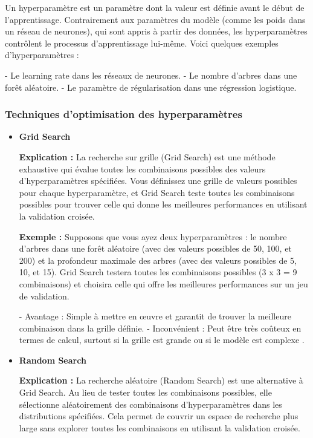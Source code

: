 \documentclass[10pt,a4paper]{article}
\begin{document}
Un hyperparamètre est un paramètre dont la valeur est définie avant le début de l'apprentissage. Contrairement aux paramètres du modèle (comme les poids dans un réseau de neurones), qui sont appris à partir des données, les hyperparamètres contrôlent le processus d'apprentissage lui-même. Voici quelques exemples d'hyperparamètres :

- Le learning rate dans les réseaux de neurones.
- Le nombre d'arbres dans une forêt aléatoire.
- Le paramètre de régularisation dans une régression logistique.

\subsubsection*{Techniques d'optimisation des hyperparamètres}

\begin{itemize}
    \item \textbf{Grid Search}

    \textbf{Explication :}
    La recherche sur grille (Grid Search) est une méthode exhaustive qui évalue toutes les combinaisons possibles des valeurs d'hyperparamètres spécifiées. Vous définissez une grille de valeurs possibles pour chaque hyperparamètre, et Grid Search teste toutes les combinaisons possibles pour trouver celle qui donne les meilleures performances en utilisant la validation croisée.

    \textbf{Exemple :}
    Supposons que vous ayez deux hyperparamètres : le nombre d'arbres dans une forêt aléatoire (avec des valeurs possibles de 50, 100, et 200) et la profondeur maximale des arbres (avec des valeurs possibles de 5, 10, et 15). Grid Search testera toutes les combinaisons possibles (3 x 3 = 9 combinaisons) et choisira celle qui offre les meilleures performances sur un jeu de validation.

    - Avantage : Simple à mettre en œuvre et garantit de trouver la meilleure combinaison dans la grille définie.
    - Inconvénient : Peut être très coûteux en termes de calcul, surtout si la grille est grande ou si le modèle est complexe \cite{hyperparameter_tuning}.

    \item \textbf{Random Search}

    \textbf{Explication :}
    La recherche aléatoire (Random Search) est une alternative à Grid Search. Au lieu de tester toutes les combinaisons possibles, elle sélectionne aléatoirement des combinaisons d'hyperparamètres dans les distributions spécifiées. Cela permet de couvrir un espace de recherche plus large sans explorer toutes les combinaisons en utilisant la validation croisée.


\end{itemize}
\end{document}

